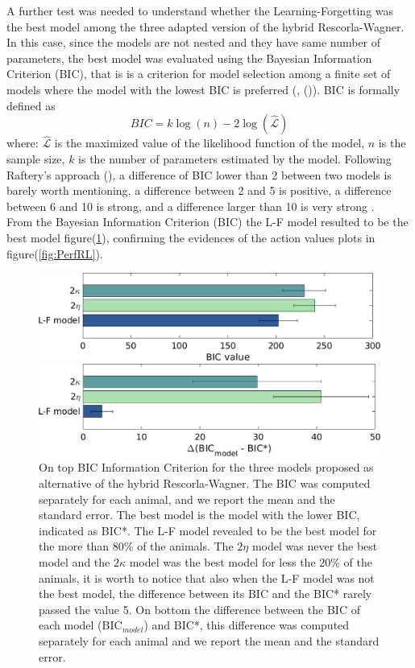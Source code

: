 A further test was needed to understand whether the Learning-Forgetting was the best model among the three adapted version of the hybrid Rescorla-Wagner. In this case, since the models are not nested and they have same number of parameters, the best model was evaluated using the Bayesian Information Criterion (BIC), that is is a criterion for model selection among a finite set of models where the model with the lowest BIC is preferred (\cite{Schwarz}, (\cite{NeathCavanaugh})). BIC is formally defined as 
\begin{equation}
    BIC=k\log(n)-2\log(\hat{\mathcal{L}})
\end{equation}
where:
${\hat{\mathcal{L}}}$ is the maximized value of the likelihood function of the model, $n$ is the sample size, $k$ is the number of parameters estimated by the model.
Following Raftery’s approach (\cite{Raftery}), a difference of BIC lower than 2 between two models is barely worth mentioning, a difference between 2 and 5 is positive, a difference between 6 and 10 is strong, and a difference larger than 10 is very strong .\\
From the Bayesian Information Criterion (BIC) the L-F model resulted to be the best model figure(\ref{fig:BIC}), confirming the evidences of the action values plots in figure(\ref{fig:PerfRL}).
\begin{figure}
    \centering
    \includegraphics[scale=0.5]{figures/BIC_Value.png}
    
    \vspace{1cm}
    
    \includegraphics[scale=0.5]{figures/DeltaBIC.png}
    \caption{On top BIC Information Criterion for the three models proposed as alternative of the hybrid Rescorla-Wagner. The BIC was computed separately for each animal, and we report the mean and the standard error. The best model is the model with the lower BIC, indicated as BIC*. The L-F model revealed to be the best model for the more than 80$\%$ of the animals. The $2\eta$ model was never the best model and the $2\kappa$ model was the best model for less the 20$\%$ of the animals, it is worth to notice that also when the L-F model was not the best model, the difference between its BIC and the BIC* rarely passed the value 5. On bottom the difference between the BIC of each model (BIC$_{model}$) and BIC*, this difference was computed separately for each animal and we report the mean and the standard error.}
    \label{fig:BIC}
\end{figure}
